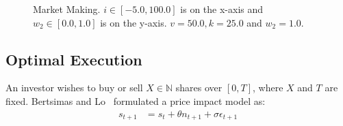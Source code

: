 \begin{figure}[h!]
    \centering
    \caption{Market Making. $ i \in \left[ -5.0, 100.0 \right]$ is on the x-axis and $ w_2 \in \left[ 0.0, 1.0 \right]$ is on the y-axis. $ v = 50.0, k = 25.0$ and $w_2 = 1.0.$}
    \label{fig:robot1d}
\end{figure}

\subsection{Optimal Execution}
\label{sec:results_oe}

An investor wishes to buy or sell {\footnotesize $ X \in \mathbb{N} $} shares over {\footnotesize $ [0, T] $}, where {\footnotesize $ X $} and {\footnotesize $ T $} are fixed. Bertsimas and Lo~\parencite{Bertsimas_JFM_1998} formulated a price impact model as:
\begin{align*}
    s_{t+1} &= s_t + \theta n_{t + 1} + \sigma \epsilon_{t+1}
\end{align*}

